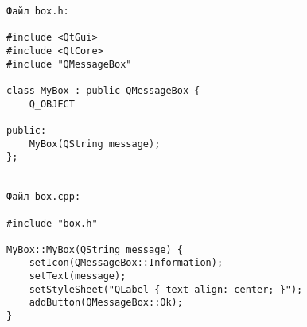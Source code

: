 \begin{verbatim}
Файл box.h:

#include <QtGui>
#include <QtCore>
#include "QMessageBox"

class MyBox : public QMessageBox {
    Q_OBJECT

public:
    MyBox(QString message);
};


Файл box.cpp:

#include "box.h"

MyBox::MyBox(QString message) {
    setIcon(QMessageBox::Information);
    setText(message);
    setStyleSheet("QLabel { text-align: center; }");
    addButton(QMessageBox::Ok);
}
\end{verbatim}
